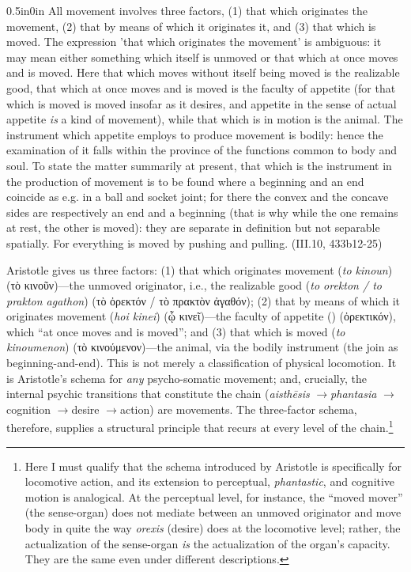 \documentclass{article}
\newcommand{\gk}[1]{{\greekfont #1}}
\newcommand{\ra}{\ensuremath{\rightarrow}}
\begin{document}
\begin{adjustwidth}{0.5in}{0in}
    All movement involves three factors, (1) that which originates the movement, (2) that by means of which it originates it, and (3) that which is moved. The expression 'that which originates the movement' is ambiguous: it may mean either something which itself is unmoved or that which at once moves and is moved. Here that which moves without itself being moved is the realizable good, that which at once moves and is moved is the faculty of appetite (for that which is moved is moved insofar as it desires, and appetite in the sense of actual appetite \textit{is} a kind of movement), while that which is in motion is the animal. The instrument which appetite employs to produce movement is bodily: hence the examination of it falls within the province of the functions common to body and soul. To state the matter summarily at present, that which is the instrument in the production of movement is to be found where a beginning and an end coincide as e.g. in a ball and socket joint; for there the convex and the concave sides are respectively an end and a beginning (that is why while the one remains at rest, the other is moved): they are separate in definition but not separable spatially. For everything is moved by pushing and pulling. (III.10, 433b12-25)
\end{adjustwidth}
Aristotle gives us three factors: (1) that which originates movement (\textit{to kinoun}) (\gk{τὸ κινοῦν})---the unmoved originator, i.e., the realizable good (\textit{to orekton / to prakton agathon}) (\gk{τὸ ὀρεκτόν / τὸ πρακτὸν ἀγαθόν}); (2) that by means of which it originates movement (\textit{hoi kinei}) (\gk{ᾧ κινεῖ})---the faculty of appetite (\textit{}) (\gk{ὀρεκτικόν}), which ``at once moves and is moved''; and (3) that which is moved (\textit{to kinoumenon}) (\gk{τὸ κινούμενον})---the animal, via the bodily instrument (the join as beginning-and-end). This is not merely a classification of physical locomotion. It is Aristotle's schema for \textit{any} psycho-somatic movement; and, crucially, the internal psychic transitions that constitute the chain (\textit{aisthēsis} \ra \textit{phantasia} \ra cognition \ra desire \ra action) are movements. The three-factor schema, therefore, supplies a structural principle that recurs at every level of the chain.\footnote{Here I must qualify that the schema introduced by Aristotle is specifically for locomotive action, and its extension to perceptual, \textit{phantastic}, and cognitive motion is analogical. At the perceptual level, for instance, the ``moved mover'' (the sense-organ) does not mediate between an unmoved originator and move body in quite the way \textit{orexis} (desire) does at the locomotive level; rather, the actualization of the sense-organ \textit{is} the actualization of the organ's capacity. They are the same even under different descriptions.}
\end{document}
